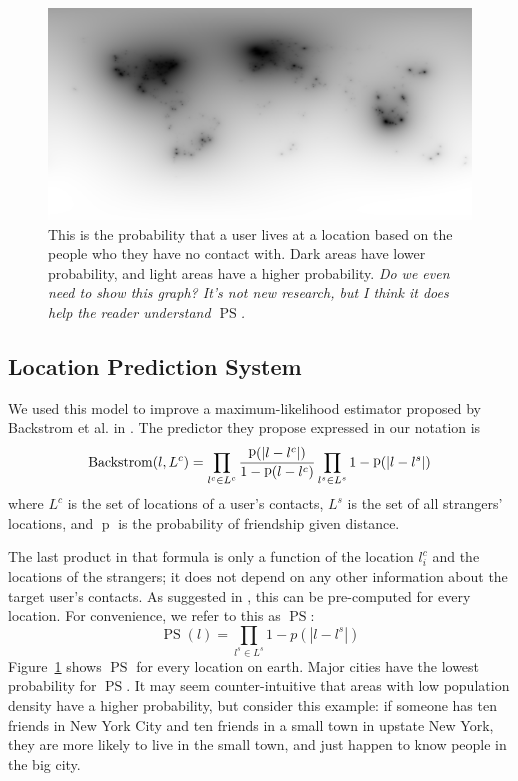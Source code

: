 \documentclass[letterpaper]{article}
\DeclareMathOperator{\pStrangers}{PS}
\DeclareMathOperator{\Backstrom}{Backstrom}
\DeclareMathOperator{\p}{p}
\newcommand{\jam}[1]{\emph{#1}}
\newcommand{\flsec}[1]{\subsection{#1}}
\begin{document}
\begin{figure}[tbh]
\centering
\includegraphics[width=\linewidth]{figures/stranger_mat.png}
\caption{
    This is the probability that a user lives at a location based on the people
    who they have no contact with. Dark areas have lower probability, and light
    areas have a higher probability.
%
\jam{Do we even need to show this graph? It's not new research, but I think it
does help the reader understand $\pStrangers$.}
}
\label{fig:StrangerMat}
\end{figure}


\flsec{Location Prediction System}
We used this model to improve a maximum-likelihood estimator proposed by
Backstrom et al. in \cite{backstrom2010find}.
%
The predictor they propose expressed in our notation is
\[
    \Backstrom(l,L^c) = 
        \prod_{l^c \in L^c} {\p(|l-l^c|) \over 1-\p(l-l^c) }
        \prod_{l^s \in L^s} 1-\p(|l-l^s|)
\]
where $L^c$ is the set of locations of a user's contacts, $L^s$ is the set
of all strangers' locations, and $\p$ is the probability of friendship given
distance.

The last product in that formula is only a function of the location $l^c_i$ and
the locations of the strangers; it does not depend on any other information
about the target user's contacts.
%
As suggested in \cite{backstrom2010find}, this can be pre-computed for every
location.
%
For convenience, we refer to this as $\pStrangers$:
\[
    \pStrangers(l) = \prod_{l^s \in L^s}1-p(|l-l^s|)
\]
Figure~\ref{fig:StrangerMat} shows $\pStrangers$ for every location on earth.
%
Major cities have the lowest probability for $\pStrangers$.
%
It may seem counter-intuitive that areas with low population density have a
higher probability, but consider this example: if someone has ten friends in
New York City and ten friends in a small town in upstate New York, they are
more likely to live in the small town, and just happen to know people in the
big city.
\end{document}
